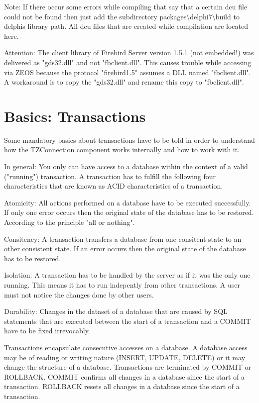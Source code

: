 \documentclass[a4paper,12pt,oneside]{book}
\begin{document}
Note: If there occur some errors while compiling that say that a certain dcu file could not be found then just add the subdirectory packages\textbackslash delphi7\textbackslash build to delphis library path.
All dcu files that are created while compilation are located here.

Attention: The client library of Firebird Server version 1.5.1 (not embedded!) was delivered as "gds32.dll" and not "fbclient.dll".
This causes trouble while accessing via ZEOS because the protocol "firebird1.5" assumes a DLL named "fbclient.dll".
A workaround is to copy the "gds32.dll" and rename this copy to "fbclient.dll".

\section{Basics: Transactions}
Some mandatory basics about transactions have to be told in order to understand how the TZConnection
component works internally and how to work with it.

In general: You only can have access to a database within the context of a valid ("running") transaction.
A transaction has to fulfill the following four characteristics that are known as ACID characteristics of a transaction.

Atomicity: All actions performed on a database have to be executed successfully.
If only one error occurs then the original state of the database has to be restored.
According to the principle "all or nothing".

Consitency: A transaction transfers a database from one consitent state to an other consistent state.
If an error occurs then the original state of the database has to be restored.

Isolation: A transaction has to be handled by the server as if it was the only one running.
This means it has to run indepently from other transactions.
A user must not notice the changes done by other users.

Durability: Changes in the dataset of a database that are caused by SQL statements that are executed between the start of a transaction and a COMMIT have to be fixed irrevocably.

Transactions encapsulate consecutive accesses on a database.
A database access may be of reading or writing nature (INSERT, UPDATE, DELETE) or it may change the structure of a database.
Transactions are terminated by COMMIT or ROLLBACK.
COMMIT confirms all changes in a database since the start of a transaction.
ROLLBACK resets all changes in a database since the start of a transaction.
\end{document}
